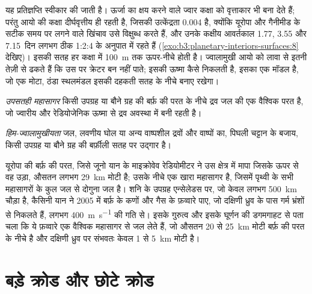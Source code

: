 यह प्रतिज्ञप्ति स्वीकार की जाती है। ऊर्जा का क्षय करने वाले ज्वार कक्षा को वृत्ताकार भी बना देते हैं;
परंतु आयो की कक्षा दीर्घवृत्तीय ही रहती है, जिसकी उत्केंद्रता 0.004 है, क्योंकि
यूरोपा और गैनीमीड के सटीक समय पर लगने वाले खिंचाव उसे विक्षुब्ध करते हैं, और उनके
कक्षीय आवर्तकाल \num{1.77}, \num{3.55} और \num{7.15}~दिन लगभग ठीक
1:2:4 के अनुपात में रहते हैं (\cref{exo:b3:planetary-interiors-surfaces:8} देखिए)। इसकी सतह
हर कक्षा में \qty{100}{m} तक ऊपर-नीचे होती है। ज्वालामुखी
आयो को लावा से इतनी तेज़ी से ढकते हैं कि उस पर क्रेटर बन नहीं पाते;
इसकी ऊष्मा कैसे निकलती है, इसका एक मॉडल  है, जो एक मोटा,
ठंडा स्थलमंडल इसकी दहकती सतह के नीचे बनाए रखेगा।

\begin{definition}[उपसतही महासागर]\label{def:b3:planetary-interiors-surfaces:ocean-world}
\emph{उपसतही महासागर} किसी उपग्रह या बौने ग्रह की बर्फ़ की परत के नीचे
द्रव जल की एक वैश्विक परत है, जो ज्वारीय और
रेडियोजेनिक ऊष्मा से द्रव अवस्था में बनी रहती है।
\end{definition}

\begin{definition}[हिम-ज्वालामुखीयता]\label{def:b3:planetary-interiors-surfaces:cryovolcanism}
\emph{हिम-ज्वालामुखीयता} जल, लवणीय घोल
या अन्य वाष्पशील द्रवों और वाष्पों का, पिघली चट्टान के बजाय,
किसी उपग्रह या बौने ग्रह की बर्फ़ीली सतह पर उद्गार है।
\end{definition}

यूरोपा की बर्फ़ की परत, जिसे जूनो यान के माइक्रोवेव रेडियोमीटर ने
उस क्षेत्र में मापा जिसके ऊपर से वह उड़ा, औसतन लगभग \qty{29}{km} मोटी है;
उसके नीचे एक खारा महासागर है, जिसमें पृथ्वी के सभी
महासागरों के कुल जल से दोगुना जल है। शनि के उपग्रह एन्सेलेडस पर, जो केवल लगभग \qty{500}{km}
चौड़ा है, कैसिनी यान ने 2005 में बर्फ़ के कणों और गैस के फ़व्वारे पाए,
जो दक्षिणी ध्रुव के पास गर्म भ्रंशों से निकलते हैं, लगभग
\qty{400}{m.s^{-1}} की गति से। इसके गुरुत्व और इसके घूर्णन की डगमगाहट से पता चला
कि ये फ़व्वारे एक वैश्विक महासागर से जल लेते हैं, जो औसतन 20 से
\qty{25}{km} मोटी बर्फ़ की परत के नीचे है और दक्षिणी ध्रुव पर संभवतः केवल 1 से
\qty{5}{km} मोटी है।

\section{बड़े क्रोड और छोटे क्रोड}\label{sec:b3:planetary-interiors-surfaces:cores}

